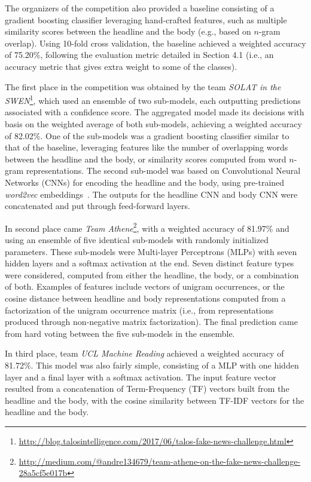 The organizers of the competition also provided a baseline consisting of a gradient boosting classifier leveraging hand-crafted features, such as multiple similarity scores between the headline and the body (e.g., based on $n$-gram overlap). Using 10-fold cross validation, the baseline achieved a weighted accuracy of 75.20\%, following the evaluation metric detailed in Section 4.1 (i.e., an accuracy metric that gives extra weight to some of the classes). 

The first place in the competition was obtained by the team \textit{SOLAT in the SWEN}\footnote{\scriptsize{\url{http://blog.talosintelligence.com/2017/06/talos-fake-news-challenge.html}}}, which used an ensemble of two sub-models, each outputting predictions associated with a confidence score. The aggregated model made its decisions with basis on the weighted average of both sub-models, achieving a weighted accuracy of 82.02\%. One of the sub-models was a gradient boosting classifier similar to that of the baseline, leveraging features like the number of overlapping words between the headline and the body, or similarity scores computed from word $n$-gram representations. The second sub-model was based on Convolutional Neural Networks (CNNs) for encoding the headline and the body, using pre-trained \textit{word2vec} embeddings~\cite{word2vec}. The outputs for the headline CNN and body CNN were concatenated and put through feed-forward layers. 

In second place came \textit{Team Athene}\footnote{\scriptsize{\url{http://medium.com/@andre134679/team-athene-on-the-fake-news-challenge-28a5cf5e017b}}}, with a weighted accuracy of 81.97\% and using an ensemble of five identical sub-models with randomly initialized parameters. These sub-models were Multi-layer Perceptrons (MLPs) with seven hidden layers and a softmax activation at the end. Seven distinct feature types were considered, computed from either the headline, the body, or a combination of both. Examples of features include vectors of unigram occurrences, or the cosine distance between headline and body representations computed from a factorization of the unigram occurrence matrix (i.e., from representations produced through non-negative matrix factorization). The final prediction came from hard voting between the five sub-models in the ensemble.

In third place, team \textit{UCL Machine Reading} \cite{riedel2017simple} achieved a weighted accuracy of 81.72\%. This model was also fairly simple, consisting of a MLP with one hidden layer and a final layer with a softmax activation. The input feature vector resulted from a concatenation of Term-Frequency (TF) vectors built from the headline and the body, with the cosine similarity between TF-IDF vectors for the headline and the body.

